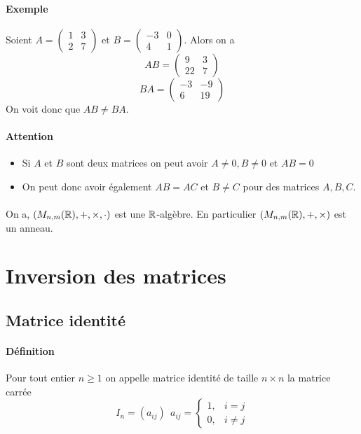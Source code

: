 \paragraph{Exemple} Soient $A = \begin{pmatrix} 1 & 3 \\ 2 & 7 \end{pmatrix}$ et $B = \begin{pmatrix} -3 & 0 \\ 4 & 1 \end{pmatrix}$. Alors on a
$$A B = \begin{pmatrix} 9 & 3 \\ 22 & 7 \end{pmatrix}$$
$$B A = \begin{pmatrix} -3 & -9 \\ 6 & 19 \end{pmatrix}$$
On voit donc que $A B \neq B A$.

\paragraph{Attention}
\begin{itemize}
  \item Si $A$ et $B$ sont deux matrices on peut avoir $A \neq 0, B \neq 0$ et $AB = 0$
  \item On peut donc avoir également $AB = AC$ et $B \neq C$ pour des matrices $A, B, C$.
\end{itemize}

\paragraph{} On a, $(M_{n, m}(\mathbb{R}), +, \times, \cdot)$ est une $\mathbb{R}$-algèbre. En particulier $(M_{n, m}(\mathbb{R}), +, \times)$ est un anneau.

%
%
\section{Inversion des matrices}
%
%


%
\subsection{Matrice identité}
%
\paragraph{Définition} Pour tout entier $n \geq 1$ on appelle matrice identité de taille $n \times n$ la matrice carrée
    $$I_n = (a_{ij}) ~ ~ a_{ij} = \left\{ \begin{array}{lr} 1, & i=j \\ 0, & i \neq j \end{array} \right.$$

